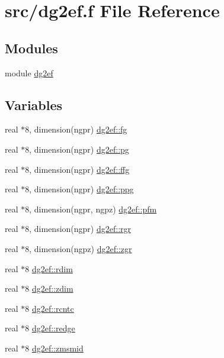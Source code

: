 \hypertarget{dg2ef_8f}{
\section{src/dg2ef.f File Reference}
\label{dg2ef_8f}
}
\subsection*{Modules}
\begin{CompactItemize}
\item 
module \hyperlink{namespacedg2ef}{dg2ef}
\end{CompactItemize}
\subsection*{Variables}
\begin{CompactItemize}
\item 
real $\ast$8, dimension(ngpr) \hyperlink{namespacedg2ef_25a2c0596b3c82876975302256bcf013}{dg2ef::fg}
\item 
real $\ast$8, dimension(ngpr) \hyperlink{namespacedg2ef_02f0b7a326715f2d470ae58927ae092f}{dg2ef::pg}
\item 
real $\ast$8, dimension(ngpr) \hyperlink{namespacedg2ef_b703812ea0c4b8c00de2c32fa197438d}{dg2ef::ffg}
\item 
real $\ast$8, dimension(ngpr) \hyperlink{namespacedg2ef_7884246d0a57fda70cd86e66469a5261}{dg2ef::ppg}
\item 
real $\ast$8, dimension(ngpr, ngpz) \hyperlink{namespacedg2ef_b6b952ebcf59b377d1bca5197bf5500e}{dg2ef::pfm}
\item 
real $\ast$8, dimension(ngpr) \hyperlink{namespacedg2ef_23ecb247101b37839cf1b4fa2cf347ac}{dg2ef::rgr}
\item 
real $\ast$8, dimension(ngpz) \hyperlink{namespacedg2ef_ca7ecaca169a88c163404ba3133ea2dc}{dg2ef::zgr}
\item 
real $\ast$8 \hyperlink{namespacedg2ef_8c12d4a3bc4da3c8ad30e8ca3d291645}{dg2ef::rdim}
\item 
real $\ast$8 \hyperlink{namespacedg2ef_33d0967f54bd092c5c377101e002674e}{dg2ef::zdim}
\item 
real $\ast$8 \hyperlink{namespacedg2ef_e49c875203b2860bc38a709d3bf237c3}{dg2ef::rcntc}
\item 
real $\ast$8 \hyperlink{namespacedg2ef_dfe0578ee984fb3f84caf5b872f07942}{dg2ef::redge}
\item 
real $\ast$8 \hyperlink{namespacedg2ef_b259c4be6a732b880895215ef00f313e}{dg2ef::zmsmid}

\end{CompactItemize}
